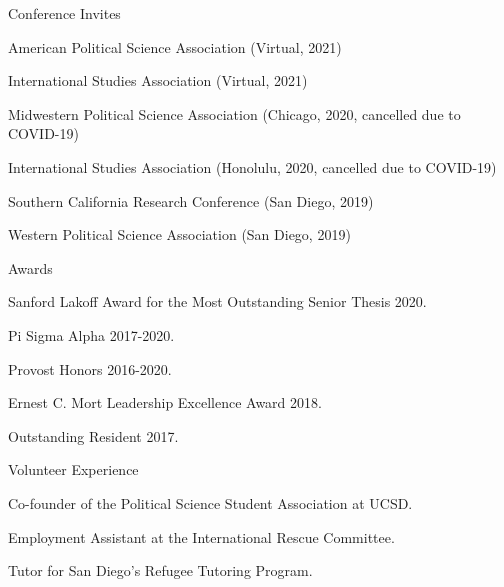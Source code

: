 \documentclass[10pt]{resume} %
\begin{document}
	\newpage
	\bigskip
	\begin{rSection}{Conference Invites}
		\itemsep -5pt
		\item American Political Science Association (Virtual, 2021)
		\item International Studies Association (Virtual, 2021)
		\item Midwestern Political Science Association (Chicago, 2020, cancelled due to COVID-19)
		\item International Studies Association (Honolulu, 2020, cancelled due to COVID-19)
		\item Southern California Research Conference (San Diego, 2019)
		\item Western Political Science Association (San Diego, 2019)
	\end{rSection}
	
	
	\begin{rSection}{Awards}
		\itemsep -5pt
		\item Sanford Lakoff Award for the Most Outstanding Senior Thesis 2020.
		\item Pi Sigma Alpha 2017-2020. 
		\item Provost Honors 2016-2020. 
		\item Ernest C. Mort Leadership Excellence Award 2018. 
		\item Outstanding Resident 2017.
	\end{rSection}
	
	\begin{rSection}{Volunteer Experience} \itemsep -5pt
		\item Co-founder of the Political Science Student Association at UCSD.
		\item Employment Assistant at the International Rescue Committee.
		\item Tutor for San Diego's Refugee Tutoring Program.
	\end{rSection}
\end{document}
